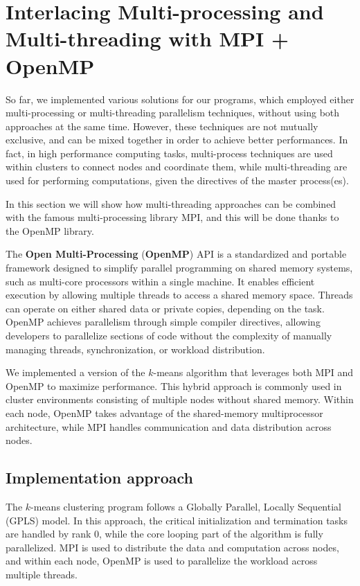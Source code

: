 \documentclass[11pt, journal]{IEEEtran}
\newcommand{\nwl}{

\vspace{11pt}

}
\begin{document}
\section{Interlacing Multi-processing and Multi-threading with MPI + OpenMP}

So far, we implemented various solutions for our programs, which employed either multi-processing or multi-threading parallelism techniques, without using both approaches at the same time. However, these techniques are not mutually exclusive, and can be mixed together in order to achieve better performances. In fact, in high performance computing tasks, multi-process techniques are used within clusters to connect nodes and coordinate them, while multi-threading are used for performing computations, given the directives of the master process(es).
\nwl
In this section we will show how multi-threading approaches can be combined with the famous multi-processing library MPI, and this will be done thanks to the OpenMP library.
\nwl
The \textbf{Open Multi-Processing} (\textbf{OpenMP}) API is a standardized and portable framework designed to simplify parallel programming on shared memory systems, such as multi-core processors within a single machine. It enables efficient execution by allowing multiple threads to access a shared memory space. Threads can operate on either shared data or private copies, depending on the task. OpenMP achieves parallelism through simple compiler directives, allowing developers to parallelize sections of code without the complexity of manually managing threads, synchronization, or workload distribution.
\nwl
We implemented a version of the $k$-means algorithm that leverages both MPI and OpenMP to maximize performance. This hybrid approach is commonly used in cluster environments consisting of multiple nodes without shared memory. Within each node, OpenMP takes advantage of the shared-memory multiprocessor architecture, while MPI handles communication and data distribution across nodes.

\subsection{Implementation approach}

The $k$-means clustering program follows a Globally Parallel, Locally Sequential (GPLS) model. In this approach, the critical initialization and termination tasks are handled by rank 0, while the core looping part of the algorithm is fully parallelized. MPI is used to distribute the data and computation across nodes, and within each node, OpenMP is used to parallelize the workload across multiple threads.
\nwl
\end{document}
